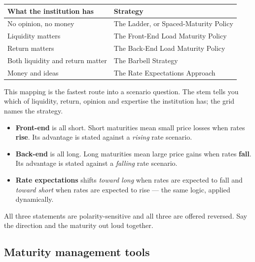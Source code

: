 \begin{lrkeybox}
\begin{center}
\small
\begin{tabularx}{0.95\textwidth}{@{}p{5.6cm} X@{}}
\toprule
\rowcolor{FRMSoft}\textbf{What the institution has} & \textbf{Strategy} \\
\midrule
No opinion, no money & The Ladder, or Spaced-Maturity Policy \\
Liquidity matters & The Front-End Load Maturity Policy \\
Return matters & The Back-End Load Maturity Policy \\
Both liquidity and return matter & The Barbell Strategy \\
Money and ideas & The Rate Expectations Approach \\
\bottomrule
\end{tabularx}
\end{center}
This mapping is the fastest route into a scenario question. The stem tells you which of liquidity, return, opinion and expertise the institution has; the grid names the strategy.
\end{lrkeybox}

\begin{lrtrapbox}
\begin{itemize}
\item \textbf{Front-end} is all short. Short maturities mean small price losses when rates \textbf{rise}. Its advantage is stated against a \emph{rising} rate scenario.
\item \textbf{Back-end} is all long. Long maturities mean large price gains when rates \textbf{fall}. Its advantage is stated against a \emph{falling} rate scenario.
\item \textbf{Rate expectations} shifts \emph{toward long} when rates are expected to fall and \emph{toward short} when rates are expected to rise — the same logic, applied dynamically.
\end{itemize}
All three statements are polarity-sensitive and all three are offered reversed. Say the direction and the maturity out loud together.
\end{lrtrapbox}

\subsection{Maturity management tools}

